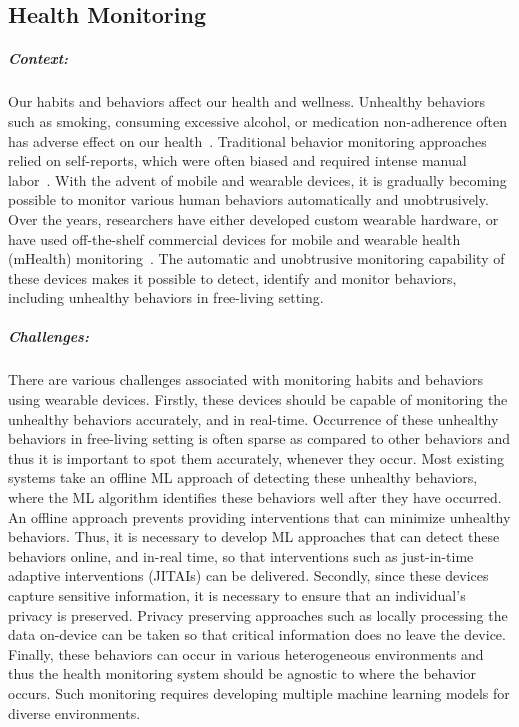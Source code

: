 \subsection{Health Monitoring}

\subparagraph*{Context:} Our habits and behaviors affect our health and wellness. Unhealthy  behaviors such as smoking, consuming excessive alcohol, or medication non-adherence often has adverse effect on our health~\cite{baker2000health,klesges1989smoking,sokol2005impact,white2013burden}. Traditional behavior monitoring approaches relied on self-reports, which were often biased and required intense manual labor~\cite{althubaiti2016information}. With the advent of mobile and wearable devices, it is gradually becoming possible to monitor various human behaviors automatically and unobtrusively. Over the years, researchers have either developed custom wearable hardware, or have used off-the-shelf commercial devices for mobile and wearable health (mHealth) monitoring~\cite{dong2012new,parate2014risq,ali2012mpuff,sen2020annapurna,bi2018auracle,zhang2020necksense,mishra2020continuous}. The automatic and unobtrusive monitoring capability of these devices makes it possible to detect, identify and monitor behaviors, including unhealthy behaviors in free-living setting.   
        
\subparagraph*{Challenges:} There are various challenges associated with monitoring habits and behaviors using wearable devices. Firstly, these devices should be capable of monitoring the unhealthy behaviors accurately, and in real-time. Occurrence of these unhealthy behaviors in free-living setting is often sparse as compared to other behaviors and thus it is important to spot them accurately, whenever they occur. Most existing systems take an offline ML approach of detecting these unhealthy behaviors, where the ML algorithm identifies these behaviors  well after they have occurred. An offline approach prevents providing interventions that can minimize unhealthy behaviors. Thus, it is necessary to develop ML approaches that can detect these behaviors online, and in-real time, so that interventions such as just-in-time adaptive interventions (JITAIs) can be delivered. Secondly, since these devices capture sensitive information, it is necessary to ensure that an individual's privacy is preserved. Privacy preserving approaches such as locally processing the data on-device can be taken so that critical information does no leave the device. 
        Finally, these behaviors can occur in various heterogeneous environments and thus the health monitoring system should be agnostic to where the behavior occurs. Such monitoring requires developing multiple machine learning models for diverse environments.  

